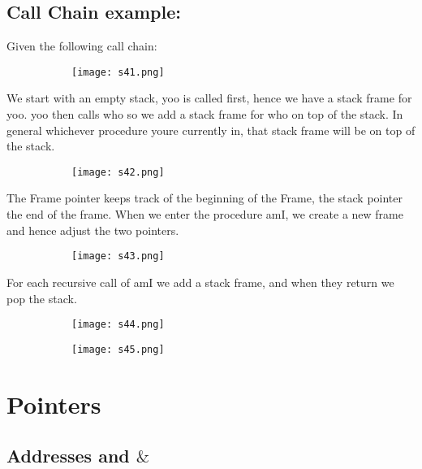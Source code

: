 \documentclass[8pt]{extreport}
\begin{document}
\subsection{Call Chain example:}
Given the following call chain:
 \begin{figure}[H]
\centering
\begin{subfigure}[b]{0.4\linewidth}
\texttt{[image: s41.png]}
\end{subfigure}
\end{figure}
We start with an empty stack, yoo is called first, hence we have a stack frame for yoo. yoo then calls who so we add a stack frame for who on top of the stack. In general whichever procedure youre currently in, that stack frame will be on top of the stack.
 \begin{figure}[H]
\centering
\begin{subfigure}[b]{0.4\linewidth}
\texttt{[image: s42.png]}
\end{subfigure}
\end{figure}
The Frame pointer keeps track of the beginning of the Frame, the stack pointer the end of the frame. When we enter the procedure amI, we create a new frame and hence adjust the two pointers.
\begin{figure}[H]
\centering
\begin{subfigure}[b]{0.4\linewidth}
\texttt{[image: s43.png]}
\end{subfigure}
\end{figure}
For each recursive call of amI we add a stack frame, and when they return we pop the stack. 
\begin{figure}[H]
\centering
\begin{subfigure}[b]{0.4\linewidth}
\texttt{[image: s44.png]}
\end{subfigure}
\begin{subfigure}[b]{0.4\linewidth}
\texttt{[image: s45.png]}
\end{subfigure}
\end{figure}


\section{Pointers}


 
\subsection{Addresses and $\&$}
\end{document}
